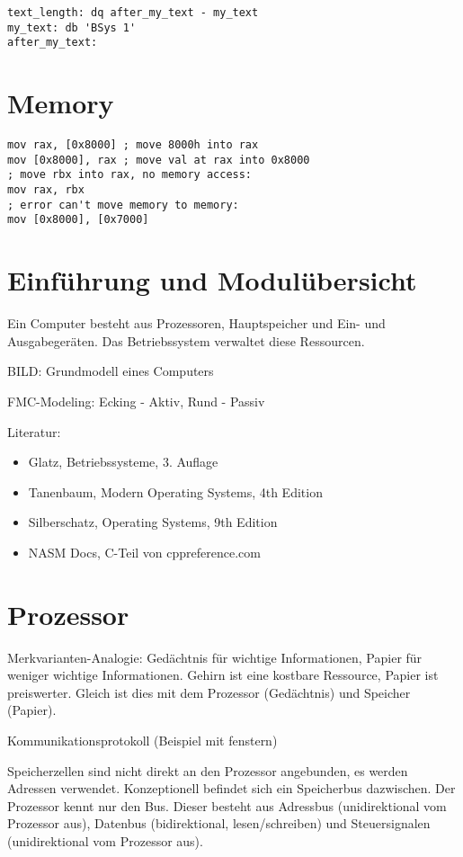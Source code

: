 \begin{multicols*}{4}
\begin{lstlisting}[language={[x86masm]Assembler}]
text_length: dq after_my_text - my_text
my_text: db 'BSys 1'
after_my_text:
\end{lstlisting}

\section{Memory}
\begin{lstlisting}[language={[x86masm]Assembler}]
mov rax, [0x8000] ; move 8000h into rax
mov [0x8000], rax ; move val at rax into 0x8000
; move rbx into rax, no memory access:
mov rax, rbx
; error can't move memory to memory:
mov [0x8000], [0x7000]
\end{lstlisting}

\section{Einführung und Modulübersicht}
Ein Computer besteht aus Prozessoren, Hauptspeicher und Ein- und Ausgabegeräten. Das Betriebssystem verwaltet diese Ressourcen.

BILD: Grundmodell eines Computers

FMC-Modeling: Ecking - Aktiv, Rund - Passiv

Literatur:
\begin{itemize}
    \item Glatz, Betriebssysteme, 3. Auflage
    \item Tanenbaum, Modern Operating Systems, 4th Edition
    \item Silberschatz, Operating Systems, 9th Edition
    \item NASM Docs, C-Teil von cppreference.com
\end{itemize}

\section{Prozessor}
Merkvarianten-Analogie: Gedächtnis für wichtige Informationen, Papier für weniger wichtige Informationen. Gehirn ist eine kostbare Ressource, Papier ist preiswerter. Gleich ist dies mit dem Prozessor (Gedächtnis) und Speicher (Papier).

Kommunikationsprotokoll (Beispiel mit fenstern)

Speicherzellen sind nicht direkt an den Prozessor angebunden, es werden Adressen verwendet. Konzeptionell befindet sich ein Speicherbus dazwischen. Der Prozessor kennt nur den Bus. Dieser besteht aus Adressbus (unidirektional vom Prozessor aus), Datenbus (bidirektional, lesen/schreiben) und Steuersignalen (unidirektional vom Prozessor aus).


\end{multicols*}

